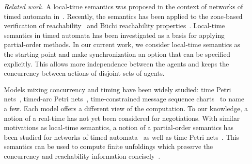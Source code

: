 \noindent\emph{Related work.} A local-time semantics was proposed in
the context of networks of timed automata
in~\cite{DBLP:conf/concur/BengtssonJLY98}. Recently, the semantics has
been applied to the zone-based verification of
reachability~\cite{DBLP:conf/concur/GovindHSW19,DBLP:conf/lics/0001HSW22}
and B\"uchi reachability
properties~\cite{DBLP:conf/concur/HerbreteauSW22}. Local-time
semantics in timed automata has been investigated as a basis for
applying partial-order methods.  In our current work, we consider
local-time semantics as the starting point and make synchronization an
option that can be specified explicitly. This allows more independence
between the agents and keeps the concurrency between actions of
disjoint sets of agents.

Models mixing concurrency and timing have been widely studied: time
Petri nets~\cite{10.5555/907383}, timed-arc Petri
nets~\cite{DBLP:conf/apn/Hanisch93}, time-constrained message sequence
charts~\cite{DBLP:conf/concur/AkshayMK07} to name a few. Each model
offers a different view of the computation. To our knowledge, a notion
of a real-time has not yet been considered for negotiations.
With similar motivations as local-time semantics, a notion of a
partial-order semantics has been studied for networks of timed
automata~\cite{DBLP:journals/tcs/LugiezNZ05} as well as time Petri
nets~\cite{DBLP:conf/formats/ChatainJ05,DBLP:conf/apn/ChatainJ06}. This
semantics can be used to compute finite unfoldings which preserve the
concurrency and reachability information
concisely~\cite{DBLP:conf/atva/CassezCJ06,DBLP:conf/atva/BouyerHR06}.

